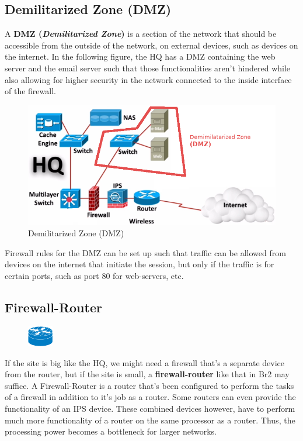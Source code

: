 \subsection{Demilitarized Zone (DMZ)}
A \textbf{DMZ (\textit{Demilitarized Zone})} is a section of the network that should be accessible from the outside of the network, on external devices, such as devices on the internet. In the following figure, the HQ has a DMZ containing the web server and the email server such that those functionalities aren't hindered while also allowing for higher security in the network connected to the inside interface of the firewall. 
\begin{figure}[H]
	\centering
	\includegraphics[width=0.7\linewidth]{"Mod1/chapters/1.2.b Network Icons/1.2.b.8 DMZ"}
	\caption{Demilitarized Zone (DMZ)}
	\label{fig:DMZ}
\end{figure}

\noindent
Firewall rules for the DMZ can be set up such that traffic can be allowed from devices on the internet that initiate the session, but only if the traffic is for certain ports, such as port 80 for web-servers, etc. 

\subsection{Firewall-Router}
\begin{figure}
	\centering
	\vspace{-10pt}
	\includegraphics[width=0.1\textwidth]{"Mod1/chapters/1.2.b Network Icons/1.2.b.9 Firewall-Router"}
	\vspace{-10pt}
\end{figure}
If the site is big like the HQ, we might need a firewall that's a separate device from the router, but if the site is small, a \textbf{firewall-router} like that in Br2 may suffice. A Firewall-Router is a router that's been configured to perform the tasks of a firewall in addition to it's job as a router. Some routers can even provide the functionality of an IPS device. These combined devices however, have to perform much more functionality of a router on the same processor as a router. Thus, the processing power becomes a bottleneck for larger networks. 

